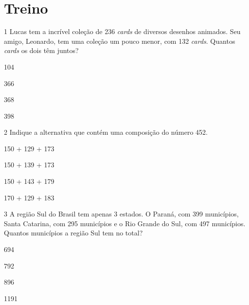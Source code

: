 

\pagebreak
\section*{Treino}

\num{1} Lucas tem a incrível coleção de 236 \emph{cards} de diversos desenhos
animados. Seu amigo, Leonardo, tem uma coleção um pouco menor, com 132
\emph{cards}. Quantos \emph{cards} os dois têm juntos?

\begin{escolha}[itemsep=-5pt]
\item 104

\item 366

\item 368

\item 398
\end{escolha}

\num{2} Indique a alternativa que contém uma composição do número 452.

\begin{escolha}[itemsep=-5pt]
\item 150 + 129 + 173

\item 150 + 139 + 173

\item 150 + 143 + 179

\item 170 + 129 + 183
\end{escolha}


\num{3} A região Sul do Brasil tem apenas 3 estados. O Paraná, com 399
municípios, Santa Catarina, com 295 municípios e o Rio Grande do Sul, com
497 municípios. Quantos municípios a região Sul tem no total?

\begin{escolha}[itemsep=-5pt]
\item 694

\item 792

\item 896

\item 1191
\end{escolha}

